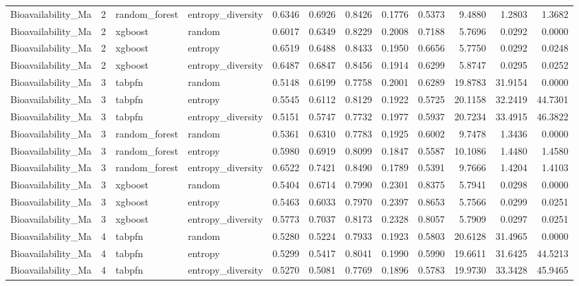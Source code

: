 \begin{tabular}{lrllrrrrrrrr}
Bioavailability_Ma & 2 & random_forest & entropy_diversity & 0.6346 & 0.6926 & 0.8426 & 0.1776 & 0.5373 & 9.4880 & 1.2803 & 1.3682 \\
Bioavailability_Ma & 2 & xgboost & random & 0.6017 & 0.6349 & 0.8229 & 0.2008 & 0.7188 & 5.7696 & 0.0292 & 0.0000 \\
Bioavailability_Ma & 2 & xgboost & entropy & 0.6519 & 0.6488 & 0.8433 & 0.1950 & 0.6656 & 5.7750 & 0.0292 & 0.0248 \\
Bioavailability_Ma & 2 & xgboost & entropy_diversity & 0.6487 & 0.6847 & 0.8456 & 0.1914 & 0.6299 & 5.8747 & 0.0295 & 0.0252 \\
Bioavailability_Ma & 3 & tabpfn & random & 0.5148 & 0.6199 & 0.7758 & 0.2001 & 0.6289 & 19.8783 & 31.9154 & 0.0000 \\
Bioavailability_Ma & 3 & tabpfn & entropy & 0.5545 & 0.6112 & 0.8129 & 0.1922 & 0.5725 & 20.1158 & 32.2419 & 44.7301 \\
Bioavailability_Ma & 3 & tabpfn & entropy_diversity & 0.5151 & 0.5747 & 0.7732 & 0.1977 & 0.5937 & 20.7234 & 33.4915 & 46.3822 \\
Bioavailability_Ma & 3 & random_forest & random & 0.5361 & 0.6310 & 0.7783 & 0.1925 & 0.6002 & 9.7478 & 1.3436 & 0.0000 \\
Bioavailability_Ma & 3 & random_forest & entropy & 0.5980 & 0.6919 & 0.8099 & 0.1847 & 0.5587 & 10.1086 & 1.4480 & 1.4580 \\
Bioavailability_Ma & 3 & random_forest & entropy_diversity & 0.6522 & 0.7421 & 0.8490 & 0.1789 & 0.5391 & 9.7666 & 1.4204 & 1.4103 \\
Bioavailability_Ma & 3 & xgboost & random & 0.5404 & 0.6714 & 0.7990 & 0.2301 & 0.8375 & 5.7941 & 0.0298 & 0.0000 \\
Bioavailability_Ma & 3 & xgboost & entropy & 0.5463 & 0.6033 & 0.7970 & 0.2397 & 0.8653 & 5.7566 & 0.0299 & 0.0251 \\
Bioavailability_Ma & 3 & xgboost & entropy_diversity & 0.5773 & 0.7037 & 0.8173 & 0.2328 & 0.8057 & 5.7909 & 0.0297 & 0.0251 \\
Bioavailability_Ma & 4 & tabpfn & random & 0.5280 & 0.5224 & 0.7933 & 0.1923 & 0.5803 & 20.6128 & 31.4965 & 0.0000 \\
Bioavailability_Ma & 4 & tabpfn & entropy & 0.5299 & 0.5417 & 0.8041 & 0.1990 & 0.5990 & 19.6611 & 31.6425 & 44.5213 \\
Bioavailability_Ma & 4 & tabpfn & entropy_diversity & 0.5270 & 0.5081 & 0.7769 & 0.1896 & 0.5783 & 19.9730 & 33.3428 & 45.9465 \\

\end{tabular}
